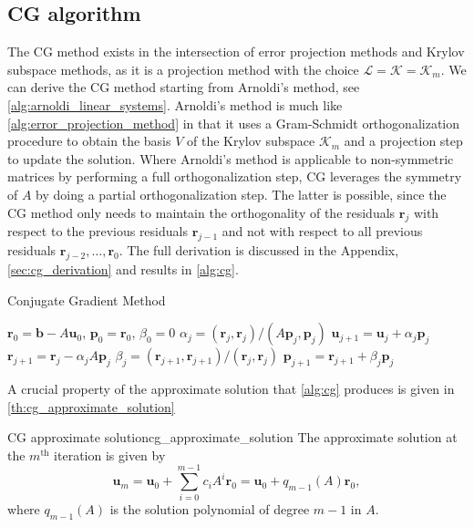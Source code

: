 \subsection{CG algorithm}
The CG method exists in the intersection of error projection methods and Krylov subspace methods, as it is a projection method with the choice $\mathcal{L} = \mathcal{K} = \mathcal{K}_m$. We can derive the CG method starting from Arnoldi's method, see \cref{alg:arnoldi_linear_systems}. Arnoldi's method is much like \cref{alg:error_projection_method} in that it uses a Gram-Schmidt orthogonalization procedure to obtain the basis $V$ of the Krylov subspace $\mathcal{K}_m$ and a projection step to update the solution. Where Arnoldi's method is applicable to non-symmetric matrices by performing a full orthogonalization step, CG leverages the symmetry of $A$ by doing a partial orthogonalization step. The latter is possible, since the CG method only needs to maintain the orthogonality of the residuals $\mathbf{r}_j$ with respect to the previous residuals $\mathbf{r}_{j-1}$ and not with respect to all previous residuals $\mathbf{r}_{j-2}, \dots, \mathbf{r}_0$. The full derivation is discussed in the Appendix, \cref{sec:cg_derivation} and results in \cref{alg:cg}.
\begin{algorithm}[H]
  \caption{Conjugate Gradient Method}
  \begin{algorithmic}
    \State $\mathbf{r}_0 = \mathbf{b} - A\mathbf{u}_0$, $\mathbf{p}_0 = \mathbf{r}_0$, $\beta_0 = 0$
    \State $\alpha_j = (\mathbf{r}_j, \mathbf{r}_j) / (A \mathbf{p}_j, \mathbf{p}_j)$
    \State $\mathbf{u}_{j+1} = \mathbf{u}_j + \alpha_j \mathbf{p}_j$
    \State $\mathbf{r}_{j+1} = \mathbf{r}_j - \alpha_j A \mathbf{p}_j$
    \State $\beta_j = (\mathbf{r}_{j+1}, \mathbf{r}_{j+1}) / (\mathbf{r}_j, \mathbf{r}_j)$
    \State $\mathbf{p}_{j+1} = \mathbf{r}_{j+1} + \beta_j \mathbf{p}_j$
    \EndFor
  \end{algorithmic}
  \label{alg:cg}
\end{algorithm}
A crucial property of the approximate solution that \cref{alg:cg} produces is given in \cref{th:cg_approximate_solution}
\begin{fancyth}{CG approximate solution}{cg_approximate_solution}
  The approximate solution at the $m^{\text{th}}$ iteration is given by
  \begin{equation}
    \mathbf{u}_m = \mathbf{u}_0 + \sum_{i=0}^{m-1} c_i A^i \mathbf{r}_0 = \mathbf{u}_0 + q_{m-1}(A)\mathbf{r}_0,
    \label{eq:cg_approximate_solution}
  \end{equation}
  where $q_{m-1}(A)$ is the solution polynomial of degree $m-1$ in $A$.
\end{fancyth}

